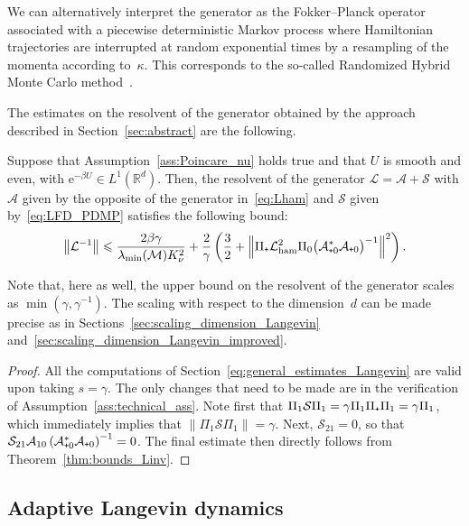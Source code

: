 \documentclass[AHL,Unicode,longabstracts,MathTools,published]{cedram}
\newcommand{\rme}{\mathrm{e}}
\newcommand{\cL}{\mathcal{L}}
\newcommand{\cLs}{\mathcal{S}}
\newcommand{\cLa}{\mathcal{A}}
\newcommand{\cLM}{\mathcal{M}}
\newcommand{\R}{\mathbb{R}}
\newcommand{\cLham}{\mathcal{L}_{\rm ham}}
\newcommand{\subplus}{\textnormal{\texttt{+}}}
\renewcommand{\leq}{\leqslant}
\begin{document}
\begin{rema}
We can alternatively interpret the generator as the Fokker--Planck operator associated with a piecewise deterministic Markov process where Hamiltonian trajectories are interrupted at random exponential times by a resampling of the momenta according to~$\kappa$. This corresponds to the so-called Randomized Hybrid Monte Carlo method~\cite{BRSS17}.
\end{rema}

The estimates on the resolvent of the generator obtained by the approach described in Section~\ref{sec:abstract} are the following.

\begin{prop}\label{prop:RHMC}
Suppose that Assumption~\ref{ass:Poincare_nu} holds true and that $U$ is smooth and even, with $\rme^{-\beta U} \in L^1(\R^d)$. Then, the resolvent of the generator $\cL = \cLa + \cLs$ with $\cLa$ given by the opposite of the generator in~\eqref{eq:Lham} and $\cLs$ given by~\eqref{eq:LFD_PDMP} satisfies the following bound:
\[
\left\|\cL^{-1}\right\| \leq \frac{2\beta\gamma}{\lambda_{\min}(\cLM) K_\nu^2} + \frac{2}{\gamma} \left(\frac32 + \left\| \Pi_\subplus \cLham^2 \Pi_0 \big(\cLa_{\subplus 0}^*\cLa_{\subplus 0}\big)^{-1} \right\|^2 \right).
\]
\end{prop}

Note that, here as well, the upper bound on the resolvent of the generator scales as $ \min(\gamma,\gamma^{-1})$. The scaling with respect to the dimension~$d$ can be made precise as in Sections~\ref{sec:scaling_dimension_Langevin} and~\ref{sec:scaling_dimension_Langevin_improved}.

\begin{proof}
All the computations of Section~\ref{eq:general_estimates_Langevin} are valid upon taking $s = \gamma$. The only changes that need to be made are in the verification of Assumption~\ref{ass:technical_ass}. Note first that $\Pi_1 \cLs \Pi_1 = \gamma \Pi_1 \Pi_\subplus \Pi_1 = \gamma \Pi_1$, which immediately implies that $\|\Pi_1 \cLs \Pi_1\| = \gamma$. Next, $\cLs_{21} = 0$, so that $\cLs_{21} \cLa_{10} \left(\cLa_{\subplus 0}^*\cLa_{\subplus 0}\right)^{-1} = 0$. The final estimate then directly follows from Theorem~\ref{thm:bounds_Linv}.
\end{proof}


\subsection{Adaptive Langevin dynamics}\label{sec:AdL}
\end{document}
